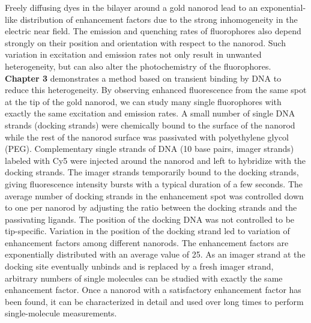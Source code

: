 Freely diffusing dyes in the bilayer around a gold nanorod lead to an exponential-like distribution of enhancement factors due to the strong inhomogeneity in the electric near field.
The emission and quenching rates of fluorophores also depend strongly on their position and orientation with respect to the nanorod.
Such variation in excitation and emission rates not only result in unwanted heterogeneity, but can also alter the photochemistry of the fluorophores.
\textbf{Chapter 3} demonstrates a method based on transient binding by DNA to reduce this heterogeneity.
By observing enhanced fluorescence from the same spot at the tip of the gold nanorod, we can study many single fluorophores with exactly the same excitation and emission rates.
A small number of single DNA strands (docking strands) were chemically bound to the surface of the nanorod while the rest of the nanorod surface was passivated with polyethylene glycol (PEG).
Complementary single strands of DNA (10 base pairs, imager strands) labeled with Cy5 were injected around the nanorod and left to hybridize with the docking strands.
The imager strands temporarily bound to the docking strands, giving fluorescence intensity bursts with a typical duration of a few seconds.
The average number of docking strands in the enhancement spot was controlled down to one per nanorod by adjusting the ratio between the docking strands and the passivating ligands.
The position of the docking DNA was not controlled to be tip-specific.
Variation in the position of the docking strand led to variation of enhancement factors among different nanorods.
The enhancement factors are exponentially distributed with an average value of 25.
As an imager strand at the docking site eventually unbinds and is replaced by a fresh imager strand, arbitrary numbers of single molecules can be studied with exactly the same enhancement factor.
Once a nanorod with a satisfactory enhancement factor has been found, it can be characterized in detail and used over long times to perform single-molecule measurements.


